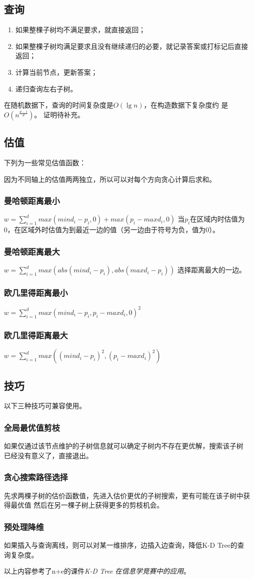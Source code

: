 \subsection{查询}
\begin{enumerate}
	\item 如果整棵子树均不满足要求，就直接返回；
	\item 如果整棵子树均满足要求且没有继续递归的必要，就记录答案或打标记后直接返回；
	\item 计算当前节点，更新答案；
	\item 递归查询左右子树。
\end{enumerate}
在随机数据下，查询的时间复杂度是$O(\lg n)$，在构造数据下复杂度约
是$O(n^\frac{d-1}{d})$。
证明待补充。
\subsection{估值}
下列为一些常见估值函数：

因为不同轴上的估值两两独立，所以可以对每个方向贪心计算后求和。
\subsubsection{曼哈顿距离最小}
$\displaystyle w=\sum_{i=1}^d{max(mind_i-p_i,0)+max(p_i-maxd_i,0)}$
当$p_i$在区域内时估值为0，在区域外时估值为到最近一边的值（另一边由于符号为负，值为0）。
\subsubsection{曼哈顿距离最大}
$\displaystyle w=\sum_{i=1}^d{max(abs(mind_i-p_i),abs(maxd_i-p_i))}$
选择距离最大的一边。
\subsubsection{欧几里得距离最小}
$\displaystyle w=\sum_{i=1}^d{max(mind_i-p_i,p_i-maxd_i,0)^2}$
\subsubsection{欧几里得距离最大}
$\displaystyle w=\sum_{i=1}^d{max((mind_i-p_i)^2,(p_i-maxd_i)^2)}$
\subsection{技巧}
以下三种技巧可兼容使用。
\subsubsection{全局最优值剪枝}
如果仅通过该节点维护的子树信息就可以确定子树内不存在更优解，搜索该子树
已经没有意义了，直接退出。
\subsubsection{贪心搜索路径选择}
先求两棵子树的估价函数值，先进入估价更优的子树搜索，更有可能在该子树中获得最优值
然后在另一棵子树上获得更多的剪枝机会。
\subsubsection{预处理降维}
如果插入与查询离线，则可以对某一维排序，边插入边查询，降低K-D Tree的查询复杂度。

以上内容参考了n+e的课件\emph{K-D Tree 在信息学竞赛中的应用}\cite{kdTree}。
